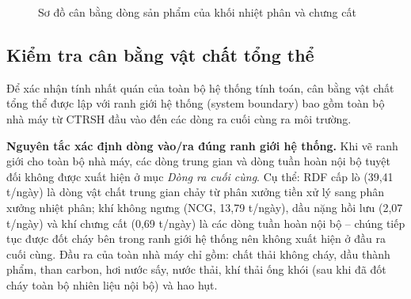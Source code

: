 \documentclass[../main.tex]{subfiles}
\begin{document}
\begin{figure}[htbp]
{%
}
\caption{Sơ đồ cân bằng dòng sản phẩm của khối nhiệt phân và chưng cất}
\label{fig:can-bang-san-pham}
\end{figure}


\subsection{Kiểm tra cân bằng vật chất tổng thể}
\label{sec:kiem-tra-hop-ly}


Để xác nhận tính nhất quán của toàn bộ hệ thống tính toán, cân bằng vật chất tổng thể được lập với ranh giới hệ thống (system boundary) bao gồm toàn bộ nhà máy từ CTRSH đầu vào đến các dòng ra cuối cùng ra môi trường.

\textbf{Nguyên tắc xác định dòng vào/ra đúng ranh giới hệ thống.} Khi vẽ ranh giới cho toàn bộ nhà máy, các dòng trung gian và dòng tuần hoàn nội bộ tuyệt đối không được xuất hiện ở mục \emph{Dòng ra cuối cùng}. Cụ thể: RDF cấp lò (39,41 t/ngày) là dòng vật chất trung gian chảy từ phân xưởng tiền xử lý sang phân xưởng nhiệt phân; khí không ngưng (NCG, 13,79 t/ngày), dầu nặng hồi lưu (2,07 t/ngày) và khí chưng cất (0,69 t/ngày) là các dòng tuần hoàn nội bộ -- chúng tiếp tục được đốt cháy bên trong ranh giới hệ thống nên không xuất hiện ở đầu ra cuối cùng. Đầu ra của toàn nhà máy chỉ gồm: chất thải không cháy, dầu thành phẩm, than carbon, hơi nước sấy, nước thải, khí thải ống khói (sau khi đã đốt cháy toàn bộ nhiên liệu nội bộ) và hao hụt.
\end{document}
